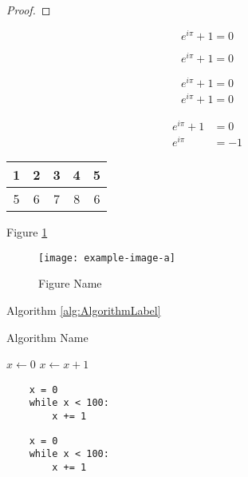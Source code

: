 \documentclass{labreport}
\begin{document}
\begin{proof}
    \lipsum[1][1-3]
\end{proof}

\begin{equation}
    e^{i\pi}+1=0
\end{equation}

\begin{equation*}
    e^{i\pi}+1=0
\end{equation*}

\begin{gather}
    e^{i\pi}+1=0 \\
    e^{i\pi}+1=0
\end{gather}

\begin{align}
    e^{i\pi}+1&=0 \\
    e^{i\pi}&=-1
\end{align}

\begin{center}
\begin{tabular}{|c|c|c|c|c|} 
    \hline
    1 & 2 & 3 & 4 & 5 \\ \hline
    5 & 6 & 7 & 8 & 6 \\ \hline
\end{tabular}
\end{center}

Figure \ref{fig:FigureLabel}

\begin{figure}[h]
    \centering\texttt{[image: example-image-a]}
    \caption{Figure Name}\label{fig:FigureLabel}
\end{figure}

Algorithm \ref{alg:AlgorithmLabel}

\begin{algorithm}
    \caption{Algorithm Name}\label{alg:AlgorithmLabel}
    \begin{algorithmic}
        \State $x \gets 0$
            \State $x \gets x + 1$
        \EndWhile
    \end{algorithmic}
\end{algorithm}

\begin{verbatim}
    x = 0
    while x < 100:
        x += 1
\end{verbatim}

\lstset{language=Python}
\begin{lstlisting}
    x = 0
    while x < 100:
        x += 1
\end{lstlisting}
\end{document}
